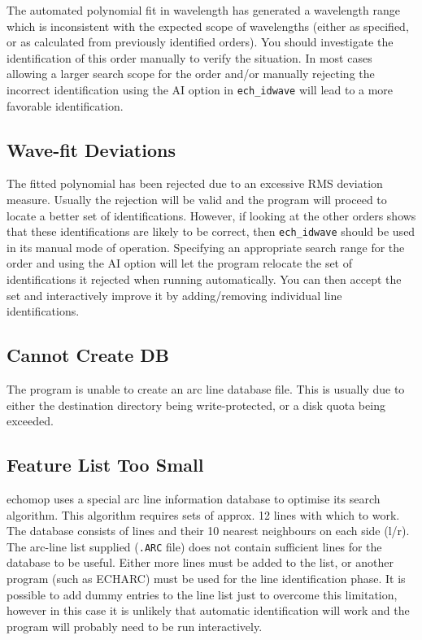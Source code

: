 \documentclass[11pt,twoside]{article}
\newcommand{\htmlref}[2]{#1}
\newcommand{\xref}[3]{#1}
\newcommand{\xlabel}[1]{}
\newcommand{\mlabel}[1]{\xlabel{#1}\label{#1}}
\begin{document}
The automated polynomial fit in wavelength has generated a wavelength
range which is inconsistent with the expected scope of wavelengths
(either as specified, or as calculated from previously identified orders).
You should investigate the identification of
this order manually to verify the situation.
In most cases allowing a larger search scope for the order and/or
manually rejecting the incorrect identification using the AI option in
\htmlref{{\tt ech\_idwave}}{ech_idwave} will
lead to a more favorable identification.

\subsection{\mlabel{wave_fit_deviations} Wave-fit Deviations}

The fitted polynomial has been rejected due to an excessive RMS
deviation measure. Usually the rejection will be valid and the program
will proceed to locate a better set of identifications. However, if
looking at the other orders shows that these
identifications are likely to be correct, then
\htmlref{{\tt ech\_idwave}}{ech_idwave}
should be used in its manual mode of operation. Specifying an
appropriate search range for the  order and using the AI option will let
the program relocate the set of identifications it rejected when running
automatically. You can then accept the set and interactively
improve it by adding/removing individual line identifications.

\subsection{\mlabel{cannot_create_db} Cannot Create DB}

The program is unable to create an arc line database file.
This is usually due to either the destination directory being
write-protected, or a disk quota being exceeded.

\subsection{\mlabel{feature_list_too_small} Feature List Too Small}

{\sc echomop} uses a special arc line information database to optimise its
search algorithm. This algorithm requires sets of approx. 12 lines with
which to work. The database consists of lines and their 10 nearest
neighbours on each side (l/r).  The arc-line list supplied (\texttt{.ARC} file)
does not contain sufficient lines for the database to be useful.
Either more lines must be added to the list,  or another program
(such as \xref{ECHARC}{sun86}{ECHARC}) must be used for the line
identification phase. It is
possible to add dummy entries to the line list just to overcome this
limitation, however in this case it is unlikely that automatic
identification will work and the program will probably need to be run
interactively.
\end{document}
